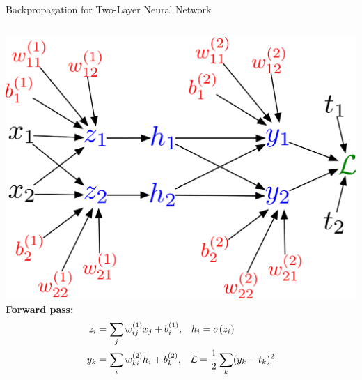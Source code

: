 \documentclass[handout,aspectratio=169]{beamer}
\begin{document}
\begin{frame}{Backpropagation for Two-Layer Neural Network}

  \begin{columns}
    \begin{column}{0.45 \linewidth}
      \includegraphics[width=0.9 \linewidth]{pics/mlp_graph.png}
      {\bf Forward pass:}
      \begin{align*}
        z_{i} &= \sum_{j} w^{(1)}_{i j} x_{j} + b^{(1)}_{i}, \;\;\;
        h_{i} = \sigma(z_{i}) \\
        y_{k} &= \sum_{i} w^{(2)}_{k i} h_{i} + b^{(2)}_{k}, \;\;\;{\cal L} = \frac{1}{2} \sum_k (y_{k} - t_{k})^2
      \end{align*}
    \end{column}


\end{columns}
\end{frame}
\end{document}

